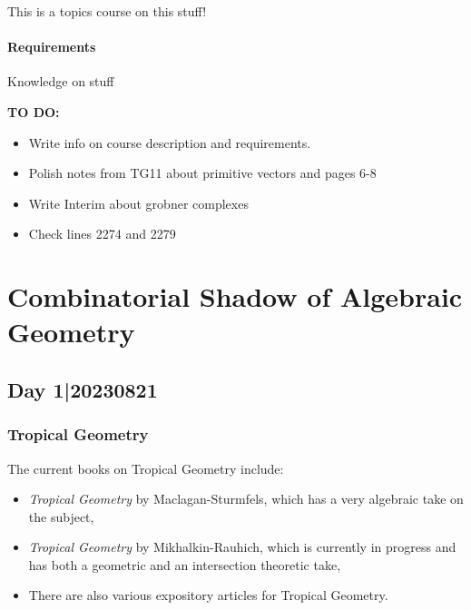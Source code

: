 \documentclass[12pt]{memoir}
\theoremstyle{definition}
\begin{document}
\maketitle
{\small 
\setlength{\parindent}{0em}
\setlength{\parskip}{1em}

This is a topics course on this stuff!

\subsubsection*{Requirements}
Knowledge on stuff\par 

\textbf{TO DO:}
\begin{itemize}
    \item Write info on course description and requirements.
    \item Polish notes from TG11 about primitive vectors and pages 6-8
    \item Write Interim about grobner complexes
    \item Check lines 2274 and 2279
\end{itemize}
}
\newpage
\tableofcontents
\chapter{Combinatorial Shadow of Algebraic Geometry}

\section{Day 1|20230821}

\subsection{Tropical Geometry}
The current books on Tropical Geometry include:
\begin{itemize}
    \item \emph{Tropical Geometry} by Maclagan-Sturmfels, which has a very algebraic take on the subject,
    \item \emph{Tropical Geometry} by Mikhalkin-Rauhich, which is currently in progress and has both a geometric and an intersection theoretic take,
    \item There are also various expository articles for Tropical Geometry.
\end{itemize}
\end{document}
